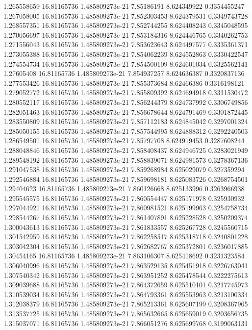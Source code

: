 {1.265558659 16.81165736 1.485809273e-21 7.85186191 8.624349922 0.3354455247
1.267058005 16.81165736 1.485809273e-21 7.852303453 8.624379531 0.3349743728
1.268557351 16.81165736 1.485809273e-21 7.852744255 8.624408243 0.3345048595
1.270056697 16.81165736 1.485809273e-21 7.853184316 8.624446765 0.3340262753
1.271556043 16.81165736 1.485809273e-21 7.853623643 8.624497577 0.3335361371
1.273055388 16.81165736 1.485809273e-21 7.854062239 8.624552863 0.3330422547
1.274554734 16.81165736 1.485809273e-21 7.854500109 8.624601034 0.3325562141
1.27605408 16.81165736 1.485809273e-21 7.854937257 8.624636387 0.3320837136
1.277553426 16.81165736 1.485809273e-21 7.855373684 8.62466386 0.3316198121
1.279052772 16.81165736 1.485809273e-21 7.855809392 8.624694918 0.3311530472
1.280552117 16.81165736 1.485809273e-21 7.856244379 8.624737992 0.3306749856
1.282051463 16.81165736 1.485809273e-21 7.856678644 8.624791469 0.3301872445
1.283550809 16.81165736 1.485809273e-21 7.857112183 8.624845042 0.3297001324
1.285050155 16.81165736 1.485809273e-21 7.857544995 8.624888312 0.3292240503
1.286549501 16.81165736 1.485809273e-21 7.85797708 8.624919453 0.3287608244
1.288048846 16.81165736 1.485809273e-21 7.858408437 8.624946725 0.3283021949
1.289548192 16.81165736 1.485809273e-21 7.858839071 8.624981573 0.3278367136
1.291047538 16.81165736 1.485809273e-21 7.859268984 8.625029079 0.327359294
1.292546884 16.81165736 1.485809273e-21 7.859698181 8.625083726 0.3268754501
1.29404623 16.81165736 1.485809273e-21 7.860126668 8.625133996 0.3263966938
1.295545575 16.81165736 1.485809273e-21 7.860554447 8.625171978 0.325930932
1.297044921 16.81165736 1.485809273e-21 7.860981521 8.625199963 0.3254758734
1.298544267 16.81165736 1.485809273e-21 7.861407891 8.625228528 0.3250209374
1.300043613 16.81165736 1.485809273e-21 7.861833557 8.625267728 0.3245560715
1.301542959 16.81165736 1.485809273e-21 7.862258517 8.625318718 0.3240801228
1.303042304 16.81165736 1.485809273e-21 7.862682767 8.625372801 0.3236017885
1.30454165 16.81165736 1.485809273e-21 7.863106307 8.625418692 0.3231323584
1.306040996 16.81165736 1.485809273e-21 7.863529135 8.625451918 0.3226763041
1.307540342 16.81165736 1.485809273e-21 7.863951252 8.625478544 0.3222275613
1.309039688 16.81165736 1.485809273e-21 7.864372659 8.625510101 0.3217745973
1.310539034 16.81165736 1.485809273e-21 7.864793361 8.625553963 0.3213100334
1.312038379 16.81165736 1.485809273e-21 7.865213361 8.625607199 0.3208367965
1.313537725 16.81165736 1.485809273e-21 7.865632665 8.625659019 0.3203656735
1.315037071 16.81165736 1.485809273e-21 7.866051276 8.625699768 0.3199063131
}

